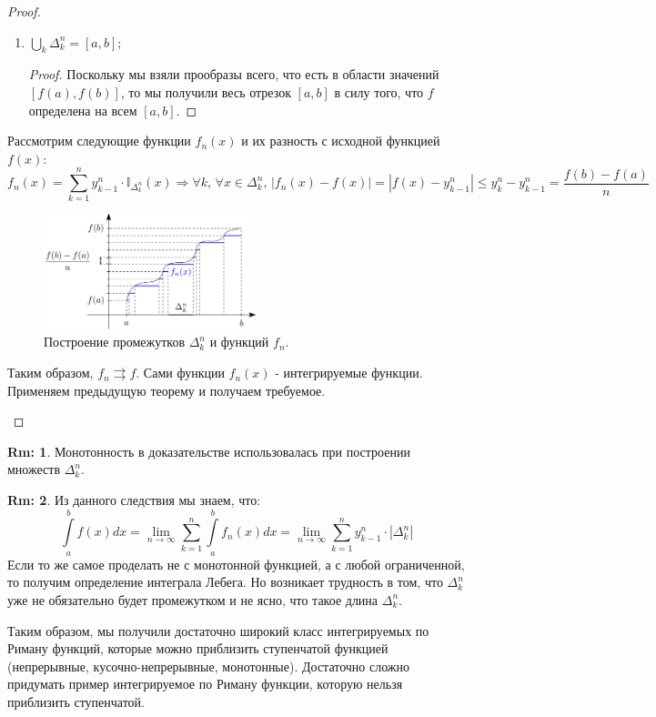 \documentclass[12pt]{article}
\theoremstyle{definition}
\newtheorem{rem}{Rm:}
\newcommand{\ddint}[2]{\displaystyle\int\limits_{#1}^{#2}}
\begin{document}
\begin{proof}
\begin{enumerate}[label={\arabic*)}]
\begin{enumerate}[label={(\arabic*)}]
\begin{proof}
			\end{proof}
			\item $\bigcup\limits_k \Delta_k^n = [a,b]$;
			\begin{proof}
				Поскольку мы взяли прообразы всего, что есть в области значений $[f(a),f(b)]$, то мы получили весь отрезок $[a,b]$ в силу того, что $f$ определена на всем $[a,b]$.
			\end{proof}
		\end{enumerate}
		Рассмотрим следующие функции $f_n(x)$ и их разность с исходной функцией $f(x)$:
		$$
			f_n(x) = \displaystyle \sum\limits_{k = 1}^{n}y_{k-1}^n{\cdot}\mathbb{I}_{\Delta_k^n}(x) \Rightarrow \forall k, \, \forall x \in \Delta_k^n, \, |f_n(x) - f(x)| = |f(x) - y_{k-1}^n| \leq y_k^n - y_{k-1}^n = \dfrac{f(b) - f(a)}{n}
		$$
		\begin{figure}[H]
			\centering
			\includegraphics[width=0.55\textwidth]{22_3.png}
			\caption{Построение промежутков $\Delta_k^n$ и функций $f_n$.}
			\label{22_3}
		\end{figure}
		Таким образом, $f_n \rightrightarrows f$. Сами функции $f_n(x)$ - интегрируемые функции. Применяем предыдущую теорему и получаем требуемое.
	\end{enumerate}
\end{proof}

\begin{rem}
	Монотонность в доказательстве использовалась при построении множеств $\Delta_k^n$.
\end{rem}
\begin{rem}
	Из данного следствия мы знаем, что: 
	$$
		\ddint{a}{b}f(x)dx = \lim\limits_{n \to \infty}\displaystyle \sum\limits_{k = 1}^n \ddint{a}{b}f_n(x)dx=  \lim\limits_{n \to \infty}\displaystyle \sum\limits_{k = 1}^ny_{k-1}^n{\cdot}|\Delta_k^n|
	$$
	Если то же самое проделать не с монотонной функцией, а с любой ограниченной, то получим определение интеграла Лебега. Но возникает трудность в том, что $\Delta_k^n$ уже не обязательно будет промежутком и не ясно, что такое длина $\Delta_k^n$.
\end{rem}
Таким образом, мы получили достаточно широкий класс интегрируемых по Риману функций, которые можно приблизить ступенчатой функцией (непрерывные, кусочно-непрерывные, монотонные). Достаточно сложно придумать пример интегрируемое по Риману функции, которую нельзя приблизить ступенчатой.
\end{document}
